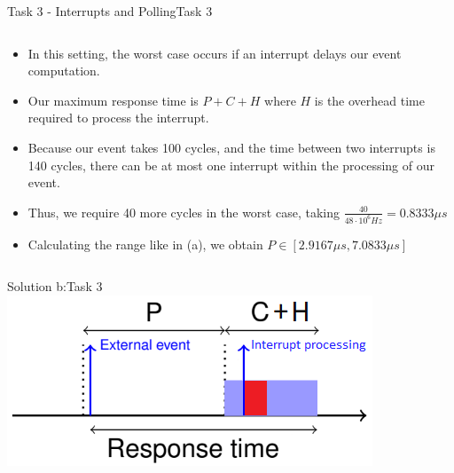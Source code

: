 \begin{frame}[fragile]{Task 3 - Interrupts and Polling}{Task 3}
  \begin{solution}
    \begin{columns}
      \begin{column}{0.8\textwidth}
        \begin{itemize}
          \item In this setting, the worst case occurs if an interrupt delays our event computation.
          \item Our maximum response time is $P + C + H$ where $H$ is the overhead time required to process the interrupt.
          \item Because our event takes 100 cycles, and the time between two interrupts is 140 cycles, there can be at most one interrupt within the processing of our event.
          \item Thus, we require 40 more cycles in the worst case, taking $\frac{40}{48 \cdot 10^6Hz} = 0.8333\mu s$
          \item Calculating the range like in (a), we obtain $P \in [2.9167\mu s, 7.0833\mu s]$
        \end{itemize}
      \end{column}
    \end{columns}
  \end{solution}
\end{frame}

\begin{frame}{Solution b:}{Task 3}
    \includegraphics[]{figures/task3-b.png}
\end{frame}

